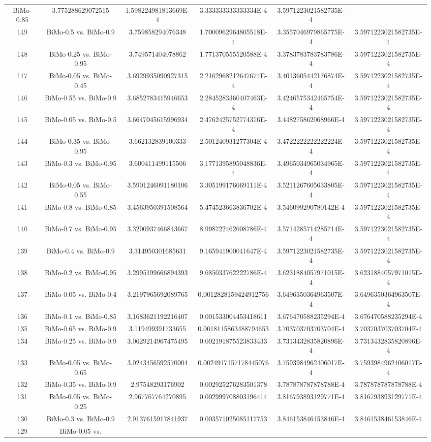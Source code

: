 \documentclass[a4paper,10pt]{article}
\begin{document}
\begin{landscape}
\begin{table}[!htp]
\begin{tabular}{cccccc}
BiMo-0.85&3.775288629072515&1.598224981813669E-4&3.333333333333334E-4&3.5971223021582735E-4\\149&BiMo-0.5 vs. BiMo-0.9&3.759858294076348&1.7000962964805518E-4&3.3557046979865775E-4&3.5971223021582735E-4\\148&BiMo-0.25 vs. BiMo-0.95&3.749571404078862&1.771370555520588E-4&3.3783783783783786E-4&3.5971223021582735E-4\\147&BiMo-0.05 vs. BiMo-0.45&3.6929935090927315&2.2162968212647674E-4&3.4013605442176874E-4&3.5971223021582735E-4\\146&BiMo-0.55 vs. BiMo-0.9&3.6852783415946653&2.2845283360407463E-4&3.4246575342465754E-4&3.5971223021582735E-4\\145&BiMo-0.05 vs. BiMo-0.5&3.6647045615996934&2.4762425752774376E-4&3.448275862068966E-4&3.5971223021582735E-4\\144&BiMo-0.35 vs. BiMo-0.95&3.662132839100333&2.501240931277304E-4&3.4722222222222224E-4&3.5971223021582735E-4\\143&BiMo-0.3 vs. BiMo-0.95&3.600411499115506&3.1771395895048836E-4&3.4965034965034965E-4&3.5971223021582735E-4\\142&BiMo-0.05 vs. BiMo-0.55&3.5901246091180106&3.305199176669111E-4&3.5211267605633805E-4&3.5971223021582735E-4\\141&BiMo-0.8 vs. BiMo-0.85&3.4563950391508564&5.474523663836702E-4&3.546099290780142E-4&3.5971223021582735E-4\\140&BiMo-0.7 vs. BiMo-0.95&3.3200937466843667&8.998722462608786E-4&3.5714285714285714E-4&3.5971223021582735E-4\\139&BiMo-0.4 vs. BiMo-0.9&3.314950301685631&9.165941900041647E-4&3.5971223021582735E-4&3.5971223021582735E-4\\138&BiMo-0.2 vs. BiMo-0.95&3.2995199666894393&9.685033762222786E-4&3.6231884057971015E-4&3.6231884057971015E-4\\137&BiMo-0.05 vs. BiMo-0.4&3.2197965692089765&0.0012828159424912756&3.6496350364963507E-4&3.6496350364963507E-4\\136&BiMo-0.1 vs. BiMo-0.85&3.1683621192216407&0.001533004453418611&3.676470588235294E-4&3.676470588235294E-4\\135&BiMo-0.65 vs. BiMo-0.9&3.119499391733655&0.0018115863488794653&3.703703703703704E-4&3.703703703703704E-4\\134&BiMo-0.25 vs. BiMo-0.9&3.0629214967475495&0.002191875523833433&3.7313432835820896E-4&3.7313432835820896E-4\\133&BiMo-0.05 vs. BiMo-0.65&3.0243456592570004&0.0024917157178445076&3.7593984962406017E-4&3.7593984962406017E-4\\132&BiMo-0.35 vs. BiMo-0.9&2.97548293176902&0.002925276283501378&3.787878787878788E-4&3.787878787878788E-4\\131&BiMo-0.05 vs. BiMo-0.25&2.967767764270895&0.002999708803196414&3.816793893129771E-4&3.816793893129771E-4\\130&BiMo-0.3 vs. BiMo-0.9&2.9137615917841937&0.003571025085117753&3.846153846153846E-4&3.846153846153846E-4\\129&BiMo-0.05 vs. 
\end{tabular}
\end{table}
\end{landscape}
\end{document}
